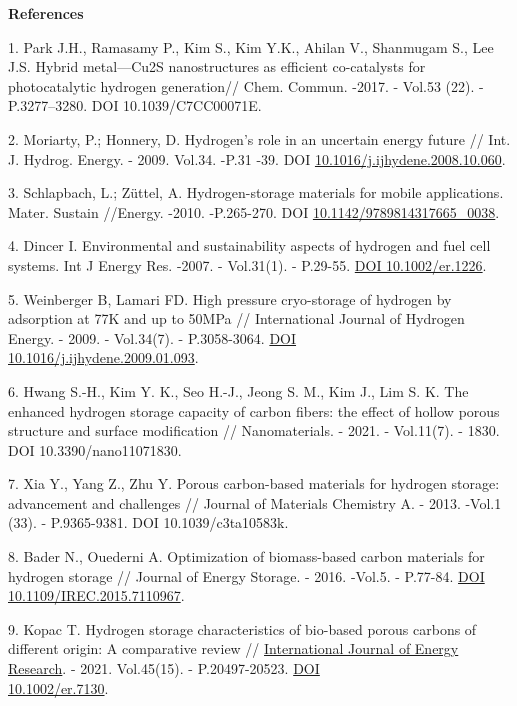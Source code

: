\begin{center}
{\bfseries References}
\end{center}

\begin{references}
1. Park J.H., Ramasamy P., Kim S., Kim Y.K., Ahilan V., Shanmugam S., Lee
J.S. Hybrid metal---Cu2S nanostructures as efficient co-catalysts for
photocatalytic hydrogen generation// Chem. Commun. -2017. - Vol.53
(22). - P.3277--3280. DOI 10.1039/C7CC00071E.

2. Moriarty, P.; Honnery, D. Hydrogen's role in an uncertain energy
future // Int. J. Hydrog. Energy. - 2009. Vol.34. -P.31 -39. DOI
\href{http://dx.doi.org/10.1016/j.ijhydene.2008.10.060}{10.1016/j.ijhydene.2008.10.060}.

3. Schlapbach, L.; Züttel, A. Hydrogen-storage materials for mobile
applications. Mater. Sustain //Energy. -2010. -P.265-270. DOI
\href{http://dx.doi.org/10.1142/9789814317665_0038}{10.1142/9789814317665\_0038}.

4. Dincer I. Environmental and sustainability aspects of hydrogen and
fuel cell systems. Int J Energy Res. -2007. - Vol.31(1). - P.29-55.
\href{https://doi.org/10.1002/er.1226}{DOI 10.1002/er.1226}.

5. Weinberger B, Lamari FD. High pressure cryo-storage of hydrogen by
adsorption at 77K and up to 50MPa // International Journal of Hydrogen
Energy. - 2009. - Vol.34(7). - P.3058-3064.
\href{https://doi.org/10.1016/j.ijhydene.2009.01.093}{DOI\\
10.1016/j.ijhydene.2009.01.093}.

6. Hwang S.-H., Kim Y. K., Seo H.-J., Jeong S. M., Kim J., Lim S. K. The
enhanced hydrogen storage capacity of carbon fibers: the effect of
hollow porous structure and surface modification // Nanomaterials. -
2021. - Vol.11(7). - 1830. DOI 10.3390/nano11071830.

7. Xia Y., Yang Z., Zhu Y. Porous carbon-based materials for hydrogen
storage: advancement and challenges // Journal of Materials Chemistry
A. - 2013. -Vol.1 (33). - P.9365-9381. DOI 10.1039/c3ta10583k.

8. Bader N., Ouederni A. Optimization of biomass-based carbon materials
for hydrogen storage // Journal of Energy Storage. - 2016. -Vol.5. -
P.77-84. \href{https://doi.org/10.1016/j.est.2015.12.009}{DOI
\href{http://dx.doi.org/10.1109/IREC.2015.7110967}{10.1109/IREC.2015.7110967}}.

9. Kopac T. Hydrogen storage characteristics of bio-based porous carbons
of different origin: A comparative review //
\href{https://onlinelibrary.wiley.com/journal/1099114x}{International
Journal of Energy Research}. - 2021. Vol.45(15). - P.20497-20523.
\href{https://doi.org/10.1002/er.7130}{DOI \\10.1002/er.7130}.


\end{references}
